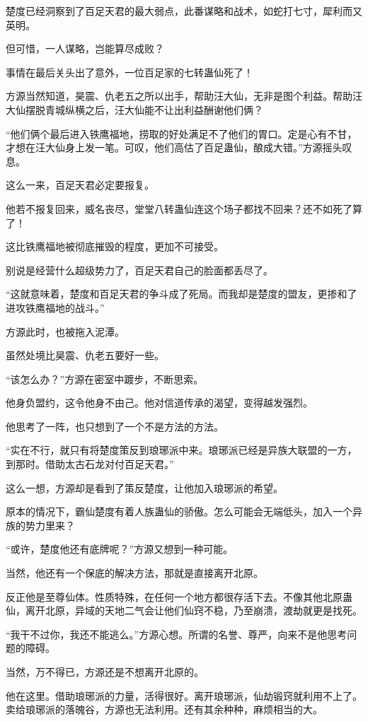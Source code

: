 \begin{this_body}
楚度已经洞察到了百足天君的最大弱点，此番谋略和战术，如蛇打七寸，犀利而又英明。

但可惜，一人谋略，岂能算尽成败？

事情在最后关头出了意外，一位百足家的七转蛊仙死了！

方源当然知道，昊震、仇老五之所以出手，帮助汪大仙，无非是图个利益。帮助汪大仙摆脱青城纵横之后，汪大仙能不让出利益酬谢他们俩？

“他们俩个最后进入铁鹰福地，捞取的好处满足不了他们的胃口。定是心有不甘，才想在汪大仙身上发一笔。可叹，他们高估了百足蛊仙，酿成大错。”方源摇头叹息。

这么一来，百足天君必定要报复。

他若不报复回来，威名丧尽，堂堂八转蛊仙连这个场子都找不回来？还不如死了算了！

这比铁鹰福地被彻底摧毁的程度，更加不可接受。

别说是经营什么超级势力了，百足天君自己的脸面都丢尽了。

“这就意味着，楚度和百足天君的争斗成了死局。而我却是楚度的盟友，更掺和了进攻铁鹰福地的战斗。”

方源此时，也被拖入泥潭。

虽然处境比昊震、仇老五要好一些。

“该怎么办？”方源在密室中踱步，不断思索。

他身负盟约，这令他身不由己。他对信道传承的渴望，变得越发强烈。

他思考了一阵，也只想到了一个不是方法的方法。

“实在不行，就只有将楚度策反到琅琊派中来。琅琊派已经是异族大联盟的一方，到那时。借助太古石龙对付百足天君。”

这么一想，方源却是看到了策反楚度，让他加入琅琊派的希望。

原本的情况下，霸仙楚度有着人族蛊仙的骄傲。怎么可能会无端低头，加入一个异族的势力里来？

“或许，楚度他还有底牌呢？”方源又想到一种可能。

当然，他还有一个保底的解决方法，那就是直接离开北原。

反正他是至尊仙体。性质特殊，在任何一个地方都很存活下去。不像其他北原蛊仙，离开北原，异域的天地二气会让他们仙窍不稳，乃至崩溃，渡劫就更是找死。

“我干不过你，我还不能逃么。”方源心想。所谓的名誉、尊严，向来不是他思考问题的障碍。

当然，万不得已，方源还是不想离开北原的。

他在这里。借助琅琊派的力量，活得很好。离开琅琊派，仙劫锻窍就利用不上了。卖给琅琊派的落魄谷，方源也无法利用。还有其余种种，麻烦相当的大。


\end{this_body}
